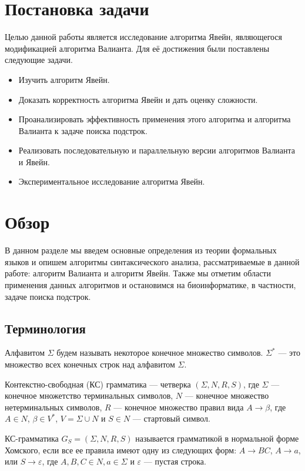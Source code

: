 \documentclass[14pt]{matmex-diploma-custom}
\begin{document}
\section{Постановка задачи}

Целью данной работы является исследование алгоритма Явейн, являющегося модификацией алгоритма Валианта.
Для её достижения были поставлены следующие задачи.

\begin{itemize}
	\item Изучить алгоритм Явейн.
	\item Доказать корректность алгоритма Явейн и дать оценку сложности.
	\item Проанализировать эффективность применения этого алгоритма и алгоритма Валианта к задаче поиска подстрок.
	\item Реализовать последовательную и параллельную версии алгоритмов Валианта и Явейн.
	\item Экспериментальное исследование алгоритма Явейн.
\end{itemize}
	

\section{Обзор}

В данном разделе мы введем основные определения из теории формальных языков и опишем алгоритмы синтаксического анализа, рассматриваемые в данной работе: алгоритм Валианта и алгоритм Явейн. Также мы отметим области применения данных алгоритмов и остановимся на биоинформатике, в частности, задаче поиска подстрок.

\subsection{Терминология}

Алфавитом $\Sigma$ будем называть некоторое конечное множество символов.
$\Sigma^{*}$ --- это множество всех конечных строк над алфавитом $\Sigma$.

Контекстно-свободная (КС) грамматика --- четверка $(\Sigma, N, R, S)$, где $\Sigma$ --- конечное множетство терминальных символов, $N$ --- конечное множество нетерминальных символов, $R$ --- конечное множество правил вида $A \rightarrow \beta$, где $A \in N$, $\beta \in V^{*}$, $V = \Sigma \cup N$ и $S \in N$ --- стартовый символ.

КС-грамматика $G_S = (\Sigma, N, R, S)$ называется грамматикой в нормальной форме Хомского, если все ее правила имеют одну из следующих форм: $A \rightarrow BC$, $A \rightarrow a$, или $S \rightarrow \varepsilon$, 
где $A, B, C \in N, a \in \Sigma$ и $\varepsilon$ --- пустая строка.
\end{document}
